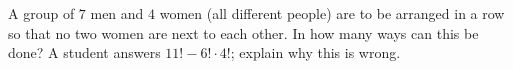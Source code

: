 A group of $7$ men and $4$ women (all different people) are to be arranged in a row so that no two women are next to each other. In how many ways can this be done? A student answers $11!-6!\cdot4!$; explain why this is wrong.
